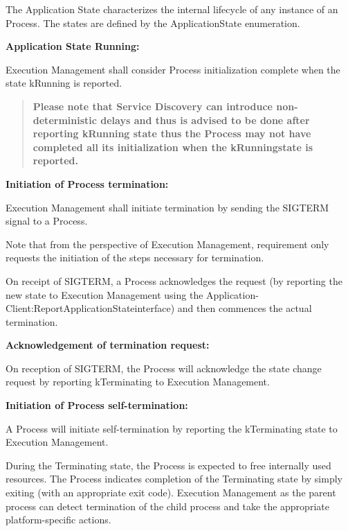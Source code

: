\begin{DoxyItemize}
\item The Application State characterizes the internal lifecycle of any instance of an Process. The states are defined by the Application\+State enumeration.
\item {\bfseries Application State Running\+:}
\begin{DoxyItemize}
\item Execution Management shall consider Process initialization complete when the state k\+Running is reported. \begin{quote}
{\bfseries Please note that Service Discovery can introduce non-\/deterministic delays and thus is advised to be done after reporting k\+Running state thus the Process may not have completed all its initialization when the k\+Runningstate is reported.} \end{quote}

\end{DoxyItemize}
\item {\bfseries Initiation of Process termination\+:}
\begin{DoxyItemize}
\item Execution Management shall initiate termination by sending the S\+I\+G\+T\+E\+RM signal to a Process.
\item Note that from the perspective of Execution Management, requirement only requests the initiation of the steps necessary for termination.
\item On receipt of S\+I\+G\+T\+E\+RM, a Process acknowledges the request (by reporting the new state to Execution Management using the Application-\/\+Client\+:Report\+Application\+Stateinterface) and then commences the actual termination.
\end{DoxyItemize}
\item {\bfseries Acknowledgement of termination request\+:}
\begin{DoxyItemize}
\item On reception of S\+I\+G\+T\+E\+RM, the Process will acknowledge the state change request by reporting k\+Terminating to Execution Management.
\end{DoxyItemize}
\item {\bfseries Initiation of Process self-\/termination\+:}
\begin{DoxyItemize}
\item A Process will initiate self-\/termination by reporting the k\+Terminating state to Execution Management.
\item During the Terminating state, the Process is expected to free internally used resources. The Process indicates completion of the Terminating state by simply exiting (with an appropriate exit code). Execution Management as the parent process can detect termination of the child process and take the appropriate platform-\/specific actions.
\end{DoxyItemize}
\end{DoxyItemize}

